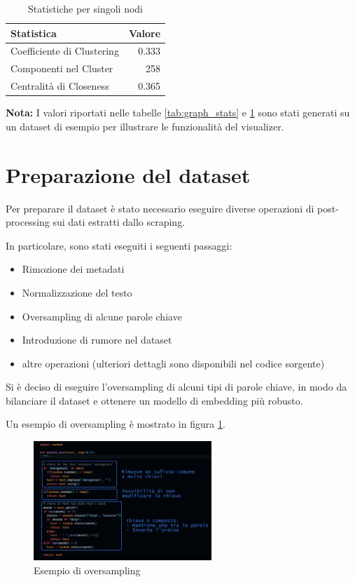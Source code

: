 \begin{table}[H]
      \centering
      \begin{tabularx}{\textwidth}{@{}l @{\extracolsep{\fill}} r@{}}
            \toprule
            Statistica                 & Valore \\
            \midrule
            Coefficiente di Clustering & 0.333  \\
            Componenti nel Cluster     & 258    \\
            Centralità di Closeness    & 0.365  \\
            \bottomrule
      \end{tabularx}
      \caption{Statistiche per singoli nodi}
      \label{tab:node_stats}
\end{table}

\noindent
\textbf{Nota:}
I valori riportati nelle tabelle \ref{tab:graph_stats} e
\ref{tab:node_stats} sono stati generati su un dataset di
esempio per illustrare le funzionalità del visualizer.

\section{Preparazione del dataset}
\label{sec:dataset_prep}
Per preparare il dataset è stato necessario eseguire
diverse operazioni di post-processing sui dati estratti
dallo scraping.

In particolare, sono stati eseguiti i seguenti passaggi:
\begin{itemize}
      \item Rimozione dei metadati
      \item Normalizzazione del testo
      \item Oversampling di alcune parole chiave
      \item Introduzione di rumore nel dataset
      \item altre operazioni (ulteriori dettagli sono
            disponibili nel codice sorgente)
\end{itemize}

Si è deciso di eseguire l'oversampling di alcuni tipi di
parole chiave, in modo da bilanciare il dataset e ottenere
un modello di embedding più robusto.

Un esempio di oversampling è mostrato in figura
\ref{fig:oversampling}.

\begin{figure}[H]
      \centering
      \includegraphics[width=0.6\textwidth]{res/noise.png}
      \caption{Esempio di oversampling}
      \label{fig:oversampling}
\end{figure}

